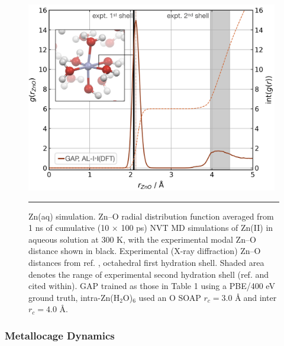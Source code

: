 \documentclass[../../main.tex]{subfiles}
\begin{document}
\begin{figure}[h!]
	\vspace{0.4cm}
	\centering
	\includegraphics[width=11cm]{6/gap/figs_ms/fig3}
	\vspace{0.2cm}
	\hrule
	\caption{Zn(aq) simulation. Zn–O radial distribution function averaged from 1 ns of cumulative (10 × 100 ps) NVT MD simulations of Zn(II) in aqueous solution at 300 K, with the experimental modal Zn–O distance shown in black. Experimental (X-ray diffraction) Zn–O distances from ref. \cite{Ohtaki1993}, octahedral first hydration shell. Shaded area denotes the range of experimental second hydration shell (ref. \cite{Ohtaki1993} and cited within). GAP trained as those in Table 1 using a PBE/400 eV ground truth, intra-Zn(H${}_2$O)${}_6$ used an O SOAP $r_c = 3.0$ \AA$\;$and inter $r_c = 4.0$ \AA.}
	\label{fig::ml_3}
\end{figure}


\subsubsection{Metallocage Dynamics}
\end{document}
